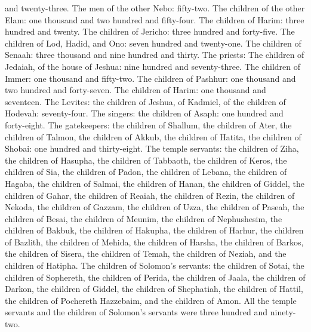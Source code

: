 and twenty-three.  The men of the other Nebo: fifty-two.
 The children of the other Elam: one thousand and two
hundred and fifty-four.  The children of Harim: three
hundred and twenty.  The children of Jericho: three
hundred and forty-five.  The children of Lod, Hadid, and
Ono: seven hundred and twenty-one.  The children of
Senaah: three thousand and nine hundred and thirty.  The
priests: The children of Jedaiah, of the house of Jeshua: nine hundred
and seventy-three.  The children of Immer: one thousand
and fifty-two.  The children of Pashhur: one thousand and
two hundred and forty-seven.  The children of Harim: one
thousand and seventeen.  The Levites: the children of
Jeshua, of Kadmiel, of the children of Hodevah: seventy-four.
 The singers: the children of Asaph: one hundred and
forty-eight.  The gatekeepers: the children of Shallum,
the children of Ater, the children of Talmon, the children of Akkub, the
children of Hatita, the children of Shobai: one hundred and
thirty-eight.  The temple servants: the children of Ziha,
the children of Hasupha, the children of Tabbaoth,  the
children of Keros, the children of Sia, the children of Padon,
 the children of Lebana, the children of Hagaba, the
children of Salmai,  the children of Hanan, the children
of Giddel, the children of Gahar,  the children of
Reaiah, the children of Rezin, the children of Nekoda, 
the children of Gazzam, the children of Uzza, the children of Paseah,
 the children of Besai, the children of Meunim, the
children of Nephushesim,  the children of Bakbuk, the
children of Hakupha, the children of Harhur,  the
children of Bazlith, the children of Mehida, the children of Harsha,
 the children of Barkos, the children of Sisera, the
children of Temah,  the children of Neziah, and the
children of Hatipha.  The children of Solomon's servants:
the children of Sotai, the children of Sophereth, the children of
Perida,  the children of Jaala, the children of Darkon,
the children of Giddel,  the children of Shephatiah, the
children of Hattil, the children of Pochereth Hazzebaim, and the
children of Amon.  All the temple servants and the
children of Solomon's servants were three hundred and ninety-two.

